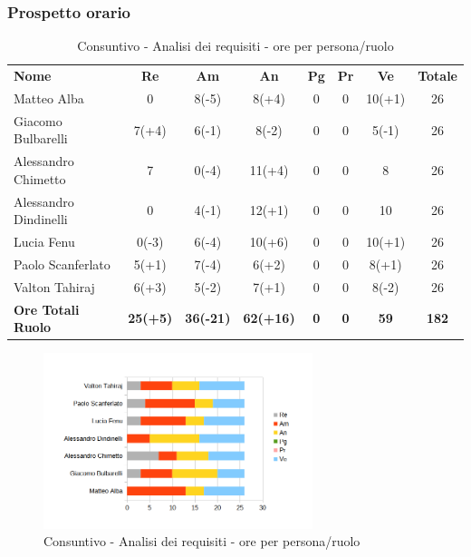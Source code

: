 \subsubsection{Prospetto orario}
	\begin{table} [h!]
	\begin{center}
		\begin{tabular} {m{3.5cm} c c c c c c c }
			\rowcolor{lightgray}
			\textbf{Nome} & \textbf{Re} & \textbf{Am} & \textbf{An} & \textbf{Pg} &\textbf{Pr} & \textbf{Ve} & \textbf{Totale} \\ 
			Matteo Alba & 0 & 8(-5) &8(+4) & 0 & 0 & 10(+1) & 26  \\ 
			Giacomo Bulbarelli & 7(+4) & 6(-1) & 8(-2) & 0 & 0 & 5(-1) & 26 \\ 
			Alessandro Chimetto & 7 & 0(-4) & 11(+4) & 0 & 0 & 8 & 26 \\
			Alessandro Dindinelli & 0 & 4(-1) & 12(+1) & 0 & 0 & 10 & 26 \\
			Lucia Fenu & 0(-3) & 6(-4) & 10(+6) & 0 & 0 & 10(+1) & 26 \\
			Paolo Scanferlato & 5(+1) & 7(-4) & 6(+2) & 0 & 0 & 8(+1) & 26 \\
			Valton Tahiraj & 6(+3) & 5(-2) &7(+1) & 0 & 0 & 8(-2) & 26 \\
			\textbf{Ore Totali Ruolo} & \textbf{25(+5)} & \textbf{36(-21)} & \textbf{62(+16)} & \textbf{0} & \textbf{0} & \textbf{59} & \textbf{182}\\
		
		\end{tabular}
		\caption{Consuntivo - Analisi dei requisiti - ore per persona/ruolo}
	\end{center}
\end{table}

	\begin{figure} [h!]
	\centering
	\includegraphics[width=0.7\textwidth]{res/img/grafici/consuntivo-barre_ ore analisi requisiti.png}
	\caption{Consuntivo - Analisi dei requisiti - ore per persona/ruolo} 
\end{figure}


